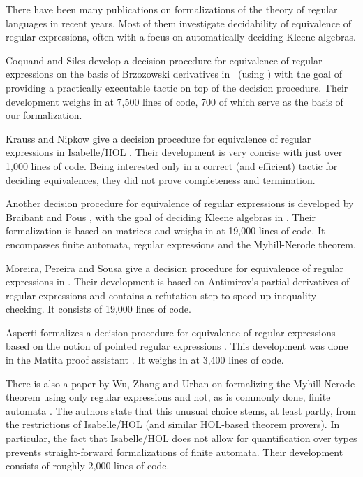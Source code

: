 There have been many publications on formalizations of the theory of regular languages in recent years.
Most of them investigate decidability of equivalence of regular expressions, often with a focus on automatically deciding Kleene algebras.


Coquand and Siles develop a decision procedure for equivalence of regular expressions \cite{DBLP:conf/cpp/CoquandS11} on the basis of Brzozowski derivatives \cite{DBLP:journals/jacm/Brzozowski64} in \coq\ (using \ssreflect) with the goal of providing a practically executable tactic on top of the decision procedure. 
Their development weighs in at 7,500 lines of code, 700 of which serve as the basis of our formalization.


Krauss and Nipkow give a decision procedure for equivalence of regular expressions in Isabelle/HOL \cite{DBLP:journals/jar/KraussN12}. 
Their development is very concise with just over 1,000 lines of code. 
Being interested only in a correct (and efficient) tactic for deciding equivalences, they did not prove completeness and termination. 


Another decision procedure for equivalence of regular expressions is developed by Braibant and Pous \cite{DBLP:journals/corr/abs-1105-4537}, with the goal of deciding Kleene algebras in \coq. Their formalization is based on matrices and weighs in at 19,000 lines of code. It encompasses finite automata, regular expressions and the Myhill-Nerode theorem.


Moreira, Pereira and Sousa give a decision procedure for equivalence of regular expressions in \coq \cite{DBLP:conf/RelMiCS/MoreiraPS12}.
Their development is based on Antimirov's partial derivatives of regular expressions \cite{DBLP:journals/tcs/Antimirov96} and contains a refutation step to speed up inequality checking. It consists of 19,000 lines of code.


Asperti formalizes a decision procedure for equivalence of regular expressions \cite{DBLP:conf/itp/Asperti12} based on the notion of pointed regular expressions \cite{DBLP:journals/corr/abs-1010-2604}. This development was done in the Matita proof assistant \cite{DBLP:conf/cade/AspertiRCT11}. It weighs in at 3,400 lines of code.


There is also a paper by Wu, Zhang and Urban on formalizing the Myhill-Nerode theorem using only regular expressions and not, as is commonly done, finite automata \cite{DBLP:conf/itp/WuZU11}.
The authors state that this unusual choice stems, at least partly, from the restrictions of Isabelle/HOL (and similar HOL-based theorem provers). 
In particular, the fact that Isabelle/HOL does not allow for quantification over types prevents straight-forward formalizations of finite automata.
Their development consists of roughly 2,000 lines of code.


